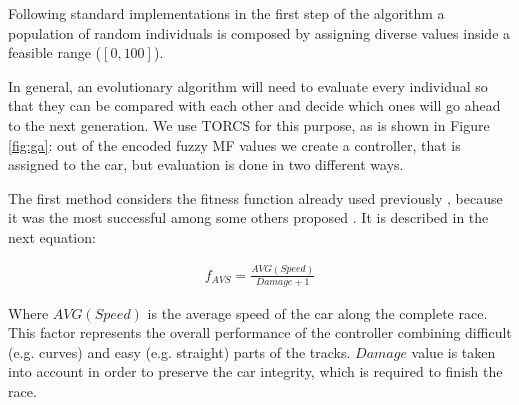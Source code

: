 \documentclass[10pt,journal,compsoc]{IEEEtran}
\begin{document}




Following standard implementations in the first step of the algorithm \cite{salem_evo18} a
population of random individuals is composed by assigning diverse values inside a feasible range ($[0,100]$).

In general, an evolutionary algorithm will need to evaluate every
individual so that they can be compared with each other and decide
which ones will go ahead to the next generation. We use TORCS for this
purpose, as is shown in Figure \ref{fig:ga}: out of the encoded fuzzy
MF values we create a controller, that is assigned to the car, but
evaluation is done in two different ways.

The first method considers the fitness function already used
previously \cite{salem_cig2018}, because it was the most successful 
among some others proposed \cite{salem_evo18}. It is described in the
next equation: 

 \begin{equation} \label{fit_avg}
 	\begin{array}{lll}
 		f_{AVS}= \frac{AVG(Speed)}{Damage+1}
 	\end{array}
 \end{equation}	

Where $AVG(Speed)$ is the average speed of the car along the complete
race. This factor represents the overall performance of the controller
combining difficult (e.g. curves) and easy (e.g. straight) parts of
the tracks. $Damage$ value is taken into account in order to preserve
the car integrity, which is required to finish the race. 
\end{document}
